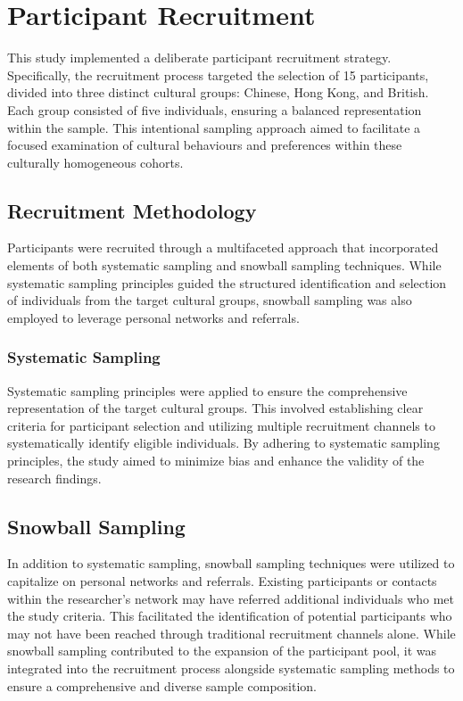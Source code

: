 \section{Participant Recruitment}

This study implemented a deliberate participant recruitment strategy. Specifically, the recruitment process targeted the selection of 15 participants, divided into three distinct cultural groups: Chinese, Hong Kong, and British. Each group consisted of five individuals, ensuring a balanced representation within the sample. This intentional sampling approach aimed to facilitate a focused examination of cultural behaviours and preferences within these culturally homogeneous cohorts.

\subsection{Recruitment Methodology}

Participants were recruited through a multifaceted approach that incorporated elements of both systematic sampling and snowball sampling techniques. While systematic sampling principles guided the structured identification and selection of individuals from the target cultural groups, snowball sampling was also employed to leverage personal networks and referrals.

\subsubsection{Systematic Sampling}

Systematic sampling principles were applied to ensure the comprehensive representation of the target cultural groups. This involved establishing clear criteria for participant selection and utilizing multiple recruitment channels to systematically identify eligible individuals. By adhering to systematic sampling principles, the study aimed to minimize bias and enhance the validity of the research findings.

\subsection{Snowball Sampling}

In addition to systematic sampling, snowball sampling techniques were utilized to capitalize on personal networks and referrals. Existing participants or contacts within the researcher's network may have referred additional individuals who met the study criteria. This facilitated the identification of potential participants who may not have been reached through traditional recruitment channels alone. While snowball sampling contributed to the expansion of the participant pool, it was integrated into the recruitment process alongside systematic sampling methods to ensure a comprehensive and diverse sample composition.


